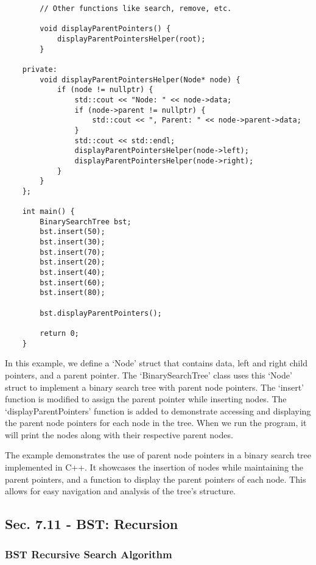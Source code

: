 \begin{solution}
\begin{verbatim}
        // Other functions like search, remove, etc.
    
        void displayParentPointers() {
            displayParentPointersHelper(root);
        }
    
    private:
        void displayParentPointersHelper(Node* node) {
            if (node != nullptr) {
                std::cout << "Node: " << node->data;
                if (node->parent != nullptr) {
                    std::cout << ", Parent: " << node->parent->data;
                }
                std::cout << std::endl;
                displayParentPointersHelper(node->left);
                displayParentPointersHelper(node->right);
            }
        }
    };
    
    int main() {
        BinarySearchTree bst;
        bst.insert(50);
        bst.insert(30);
        bst.insert(70);
        bst.insert(20);
        bst.insert(40);
        bst.insert(60);
        bst.insert(80);
    
        bst.displayParentPointers();
    
        return 0;
    }
    \end{verbatim}

    \horizontalline

    In this example, we define a `Node' struct that contains data, left and right child pointers, and a parent pointer. The `BinarySearchTree' class uses this `Node' struct to implement a binary search tree with parent node pointers. The `insert' function is modified to assign the parent pointer while inserting nodes. The `displayParentPointers' 
    function is added to demonstrate accessing and displaying the parent node pointers for each node in the tree. When we run the program, it will print the nodes along with their respective parent nodes.

    The example demonstrates the use of parent node pointers in a binary search tree implemented in C++. It showcases the insertion of nodes while maintaining the parent pointers, and a function to display the parent pointers of each node. This allows for easy navigation and analysis of the tree's structure.
\end{solution}

\subsection*{Sec. 7.11 - BST: Recursion}

\subsubsection{BST Recursive Search Algorithm}

